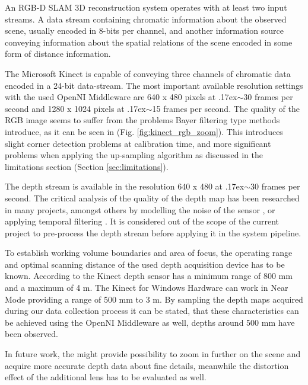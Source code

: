 \documentclass{ucl_thesis}
\newcommand{\figref}[1]{(Fig. \ref{#1})}
\newcommand{\secref}[1]{(Section \ref{#1})}
\newcommand{\mytilde}{\raise.17ex\hbox{$\scriptstyle\mathtt{\sim}$}}
\begin{document}
\par An RGB-D SLAM 3D reconstruction system operates with at least two input streams. A data stream containing chromatic information about the observed scene, usually encoded in 8-bits per channel, and another information source conveying information about the spatial relations of the scene encoded in some form of distance information.
\par The Microsoft Kinect is capable of conveying three channels of chromatic data encoded in a 24-bit data-stream. The most important available resolution settings with the used OpenNI Middleware are 640 x 480 pixels at \mytilde 30 frames per second and 1280 x 1024 pixels at \mytilde 15 frames per second. The quality of the RGB image seems to suffer from the problems Bayer filtering type methods introduce, as it can be seen in \figref{fig:kinect_rgb_zoom}. This introduces slight corner detection problems at calibration time, and more significant problems when applying the up-sampling algorithm as discussed in the limitations section \secref{sec:limitations}. 
\par The depth stream is available in the resolution 640 x 480 at \mytilde 30 frames per second. The critical analysis of the quality of the depth map has been researched in many projects, amongst others by modelling the noise of the sensor \citep{NguyenIL12}, or applying temporal filtering \citep{RGBZcamera}. It is considered out of the scope of the current project to pre-process the depth stream before applying it in the system pipeline. \\

\par To establish working volume boundaries and area of focus, the operating range and optimal scanning distance of the used depth acquisition device has to be known. According to \citep{Kinect_ms} the Kinect depth sensor has a minimum range of 800 mm and a maximum of 4 m. The Kinect for Windows Hardware can work in Near Mode providing a range of 500 mm to 3 m. By sampling the depth maps acquired during our data collection process it can be stated, that these characteristics can be achieved using the OpenNI Middleware as well, depths around 500 mm have been observed. 
\par In future work, the \citep{Kinect_nyko_zoom} might provide possibility to zoom in further on the scene and acquire more accurate depth data about fine details, meanwhile the distortion effect of the additional lens has to be evaluated as well.
\end{document}
